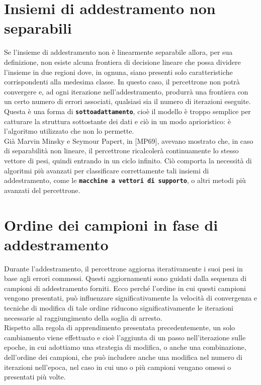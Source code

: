 \documentclass[
  letterpaper,
  DIV=11,
  numbers=noendperiod]{scrreprt}
\begin{document}
\section{Insiemi di addestramento non
separabili}\label{insiemi-di-addestramento-non-separabili}

Se l'insieme di addestramento non è linearmente separabile allora, per
sua definizione, non esiste alcuna frontiera di decisione lineare che
possa dividere l'insieme in due regioni dove, in ognuna, siano presenti
solo caratteristiche corrispondenti alla medesima classe. In questo
caso, il percettrone non potrà convergere e, ad ogni iterazione
nell'addestramento, produrrà una frontiera con un certo numero di errori
associati, qualsiasi sia il numero di iterazioni eseguite. Questa è una
forma di \textbf{\texttt{sottoadattamento}}, cioè il modello è troppo
semplice per catturare la struttura sottostante dei dati e ciò in un
modo aprioristico: è l'algoritmo utilizzato che non lo permette.\\
Già Marvin Minsky e Seymour Papert, in {[}MP69{]}, avevano mostrato che,
in caso di separabilità non lineare, il percettrone ricalcolerà
continuamente lo stesso vettore di pesi, quindi entrando in un ciclo
infinito. Ciò comporta la necessità di algoritmi più avanzati per
classificare correttamente tali insiemi di addestramento, come le
\textbf{\texttt{macchine\ a\ vettori\ di\ supporto}}, o altri metodi più
avanzati del percettrone.

\section{Ordine dei campioni in fase di
addestramento}\label{ordine-dei-campioni-in-fase-di-addestramento}

Durante l'addestramento, il percettrone aggiorna iterativamente i suoi
pesi in base agli errori commessi. Questi aggiornamenti sono guidati
dalla sequenza di campioni di addestramento forniti. Ecco perché
l'ordine in cui questi campioni vengono presentati, può influenzare
significativamente la velocità di convergenza e tecniche di modifica di
tale ordine riducono significativamente le iterazioni necessarie al
raggiungimento della soglia di arresto.\\
Rispetto alla regola di apprendimento presentata precedentemente, un
solo cambiamento viene effettuato e cioè l'aggiunta di un passo
nell'iterazione sulle epoche, in cui adottiamo una strategia di
modifica, o anche una combinazione, dell'ordine dei campioni, che può
includere anche una modifica nel numero di iterazioni nell'epoca, nel
caso in cui uno o più campioni vengano omessi o presentati più volte.
\end{document}

